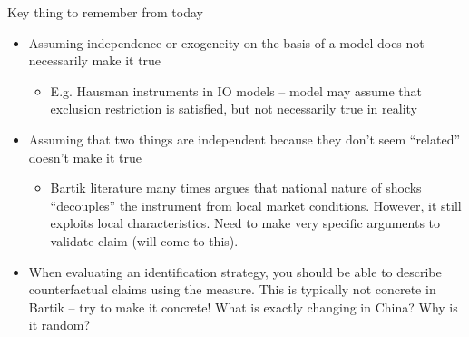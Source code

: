 \documentclass[notes,11pt, aspectratio=169]{beamer}
\begin{document}
\begin{frame}{Key thing to remember from today}
  \begin{itemize}
  \item Assuming independence or exogeneity on the basis of a model
    does not necessarily make it true
    \begin{itemize}
    \item E.g. Hausman instruments in IO models -- model may assume
      that exclusion restriction is satisfied, but not necessarily
      true in reality
    \end{itemize}
  \item Assuming that two things are independent because they don't
    seem ``related'' doesn't make it true 
    \begin{itemize}
    \item Bartik literature many times argues that national nature of
      shocks ``decouples'' the instrument from local market
      conditions. However, it still exploits local
      characteristics. Need to make very specific arguments to
      validate claim (will come to this).
    \end{itemize}
  \item When evaluating an identification strategy, you should be able
    to describe counterfactual claims using the measure. This is
    typically not concrete in Bartik -- try to make it concrete!
    What is exactly changing in China? Why is it random? 
  \end{itemize}
\end{frame}
\end{document}
